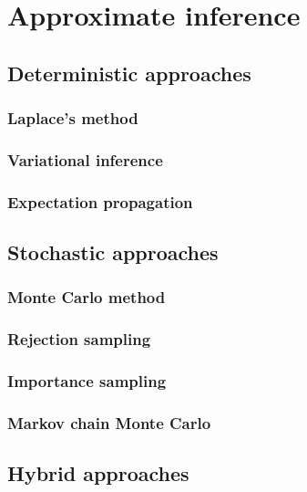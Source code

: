 \chapter{Approximate inference}\label{ch:approximate-inference}

\section{Deterministic approaches}

\subsection{Laplace's method}

\subsection{Variational inference}

\subsection{Expectation propagation}

\section{Stochastic approaches}

\subsection{Monte Carlo method}

\subsection{Rejection sampling}

\subsection{Importance sampling}

\subsection{Markov chain Monte Carlo}

\section{Hybrid approaches}

